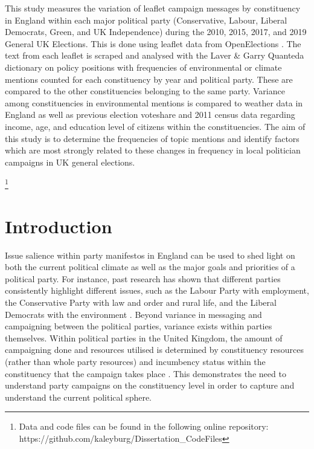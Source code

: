 \documentclass[12pt,letterpaper]{article}
\begin{document}
	This study measures the variation of leaflet campaign messages by constituency in England within each major political party (Conservative, Labour, Liberal Democrats, Green, and UK Independence) during the 2010, 2015, 2017, and 2019 General UK Elections. This is done using leaflet data from OpenElections \autocite{milazzo2020openelections}. The text from each leaflet is scraped and analysed with the Laver \& Garry Quanteda dictionary \autocite{laverEstimatingPolicyPositions2000} on policy positions with frequencies of environmental or climate mentions counted for each constituency by year and political party. These are compared to the other constituencies belonging to the same party. Variance among constituencies in environmental mentions is compared to weather data in England as well as previous election voteshare and 2011 census data regarding income, age, and education level of citizens within the constituencies. The aim of this study is to determine the frequencies of topic mentions and identify factors which are most strongly related to these changes in frequency in local politician campaigns in UK general elections.
	
	\footnote{Data and code files can be found in the following online repository: https://github.com/kaleyburg/Dissertation\_CodeFiles}
				
	\newpage
	
	\section{Introduction}
	
Issue salience within party manifestos in England can be used to shed light on both the current political climate as well as the major goals and priorities of a political party. For instance, past research has shown that different parties consistently highlight different issues, such as the Labour Party with employment, the Conservative Party with law and order and rural life, and the Liberal Democrats with the environment \autocite{pogorelisIssueSalienceRegional2005}. Beyond variance in messaging and campaigning between the political parties, variance exists within parties themselves. Within political parties in the United Kingdom, the amount of campaigning done and resources utilised is determined by constituency resources (rather than whole party resources) and incumbency status within the constituency that the campaign takes place \autocite{pattieIncumbentPartiesIncumbent2017a}. This demonstrates the need to understand party campaigns on the constituency level in order to capture and understand the current political sphere.
\end{document}
